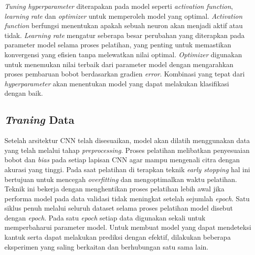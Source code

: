     \textit{Tuning hyperparameter} diterapakan pada model seperti \textit{activation function}, \textit{learning rate} dan \textit{optimizer} untuk memperoleh model yang optimal. \textit{Activation function} berfungsi menentukan apakah sebuah neuron akan menjadi aktif atau tidak. \textit{Learning rate} mengatur seberapa besar perubahan yang diterapkan pada parameter model selama proses pelatihan, yang penting untuk memastikan konvergensi yang efisien tanpa melewatkan nilai optimal. \textit{Optimizer} digunakan untuk menemukan nilai terbaik dari parameter model dengan mengarahkan proses pembaruan bobot berdasarkan gradien \textit{error}. Kombinasi yang tepat dari \textit{hyperparameter} akan menentukan model yang dapat melakukan klasifikasi dengan baik.
    
 

\subsection{\textit{Traning} Data}

    Setelah arsitektur CNN telah disesuaikan, model akan dilatih menggunakan data yang telah melalui tahap \textit{preprocessing}. Proses pelatihan melibatkan penyesuaian bobot dan \textit{bias} pada setiap lapisan CNN agar mampu mengenali citra dengan akurasi yang tinggi. Pada saat pelatihan di terapkan teknik \textit{early stopping} hal ini bertujuan untuk mencegah \textit{overfitting} dan mengoptimalkan waktu pelatihan. Teknik ini bekerja dengan menghentikan proses pelatihan lebih awal jika performa model pada data validasi tidak meningkat setelah sejumlah \textit{epoch}. Satu siklus penuh melalui seluruh dataset selama proses pelatihan model disebut dengan \textit{epoch}. Pada satu \textit{epoch} setiap data digunakan sekali untuk memperbaharui parameter model. Untuk membuat model yang dapat mendeteksi kantuk serta dapat melakukan prediksi dengan efektif, dilakukan beberapa eksperimen yang saling berkaitan dan berhubungan satu sama lain.


